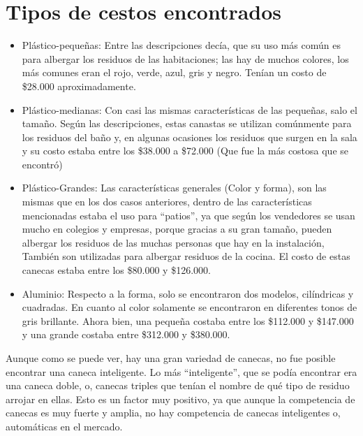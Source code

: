 \documentclass{report}
\begin{document}
    \section{Tipos de cestos encontrados}
        \begin{itemize}
        \item Plástico-pequeñas: Entre las descripciones decía, que su uso más común es para albergar los residuos de las habitaciones; las hay de muchos colores, los más comunes eran el rojo, verde, azul, gris y negro. Tenían un costo de \$28.000 aproximadamente.
        
        \item Plástico-medianas: Con casi las mismas características de las pequeñas, salo el tamaño. Según las descripciones, estas canastas se utilizan comúnmente para los residuos del baño y, en algunas ocasiones los residuos que surgen en la sala y su costo estaba entre los \$38.000 a \$72.000 (Que fue la más costosa que se encontró)
        
        \item Plástico-Grandes: Las características generales (Color y forma), son las mismas que en los dos casos anteriores, dentro de las características mencionadas estaba el uso para “patios”, ya que según los vendedores se usan mucho en colegios y empresas, porque gracias a su gran tamaño, pueden albergar los residuos de las muchas personas que hay en la instalación, También son utilizadas para albergar residuos de la cocina. El costo de estas canecas estaba entre los \$80.000 y \$126.000.
        
        \item Aluminio: Respecto a la forma, solo se encontraron dos modelos, cilíndricas y cuadradas. En cuanto al color solamente se encontraron en diferentes tonos de gris brillante. Ahora bien, una pequeña costaba entre los \$112.000 y \$147.000 y una grande costaba entre \$312.000 y \$380.000.

        
        \end{itemize}
        
    Aunque como se puede ver, hay una gran variedad de canecas, no fue posible encontrar una caneca inteligente. Lo más “inteligente”, que se podía encontrar era una caneca doble, o, canecas triples que tenían el nombre de qué tipo de residuo arrojar en ellas. Esto es un factor muy positivo, ya que aunque la competencia de canecas es muy fuerte y amplia, no hay competencia de canecas inteligentes o, automáticas en el mercado.
    
\end{document}
